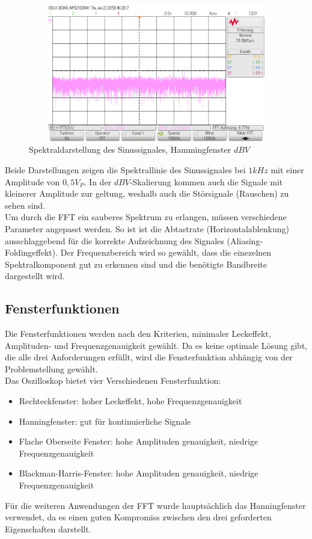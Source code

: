 \begin{figure}[H]
 \begin{center}
  \includegraphics[height=6cm,width=12cm]{OsziBilder/bsp1_Hanning_dB}
 \end{center}
 \caption{Spektraldarstellung des Sinussignales, Hammingfenster $dBV$}
\end{figure}
\noindent
Beide Darstellungen zeigen die Spektrallinie des Sinussignales bei $1kHz$ mit einer Amplitude von $0,5V_P$. In der $dBV$-Skalierung kommen auch die Signale mit kleinerer Amplitude zur geltung, weshalb auch die Störsignale (Rauschen) zu sehen sind.\\
Um durch die FFT ein sauberes Spektrum zu erlangen, müssen verschiedene Parameter angepasst werden. So ist ist die Abtastrate (Horizontalablenkung) ausschlaggebend für die korrekte Aufzeichnung des Signales (Aliasing- Foldingeffekt). Der Frequenzbereich wird so gewählt, dass
die einezelnen Spektralkomponent gut zu erkennen sind und die benötigte Bandbreite dargestellt wird.\\

\newpage
\subsection{Fensterfunktionen}

Die Fensterfunktionen werden nach den Kriterien, minimaler Leckeffekt, Amplituden- und Frequenzgenauigkeit gewählt. Da es keine optimale Lösung gibt, die alle drei Anforderungen erfüllt, wird
die Fensterfunktion abhängig von der Problemstellung gewählt.\\
Das Oszilloskop bietet vier Verschiedenen Fensterfunktion:\\
\begin{itemize}
 \item Rechteckfenster: hoher Leckeffekt, hohe Frequenzgenauigkeit\\
 \item Hanningfenster: gut für kontinuierliche Signale\\
 \item Flache Oberseite Fenster: hohe Amplituden genauigkeit, niedrige Frequenzgenauigkeit \\
 \item Blackman-Harris-Fenster:  hohe Amplituden genauigkeit, niedrige Frequenzgenauigkeit\\
\end{itemize}
Für die weiteren Anwendungen der FFT wurde hauptsächlich das Hanningfenster verwendet, da es einen guten Kompromiss
zwischen den drei geforderten Eigenschaften darstellt.\\
